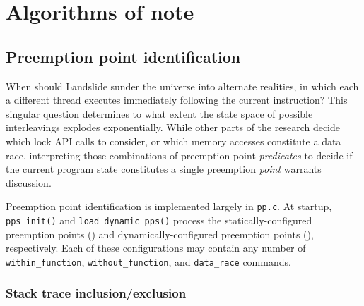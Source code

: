 
\section{Algorithms of note}



\subsection{Preemption point identification}
\label{sec:landslide-pps}

When should Landslide sunder the universe into alternate realities,
in which each a different thread executes immediately following the current instruction?
This singular question determines to what extent the state space of possible interleavings explodes exponentially.
While other parts of the research decide which lock API calls to consider,
or which memory accesses constitute a data race,
interpreting those combinations of preemption point {\em predicates}
to decide if the current program state constitutes a single preemption {\em point}
warrants discussion.

Preemption point identification is implemented largely in {\tt pp.c}.
At startup, {\tt pps\_init()} and {\tt load\_dynamic\_pps()} process the
statically-configured preemption points (\sect{\ref{sec:landslide-staticconfig}})
and dynamically-configured preemption points (\sect{\ref{sec:landslide-dynamicconfig}}),
respectively.
Each of these configurations may contain any number of
{\tt within\_function}, {\tt without\_function}, and {\tt data\_race} commands.

\subsubsection{Stack trace inclusion/exclusion}


